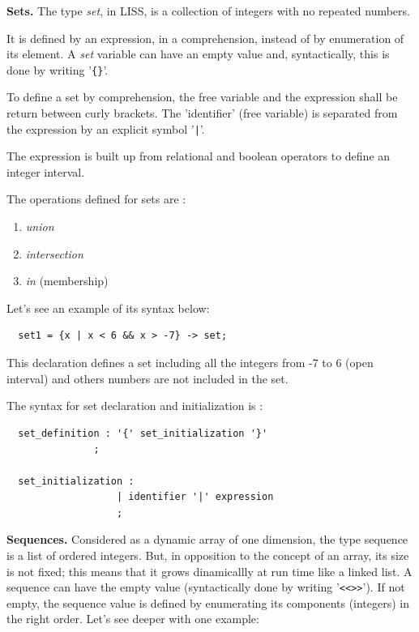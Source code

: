 \documentclass[
  oneside,
  11pt, a4paper,
  footinclude=true,
  headinclude=true,
  cleardoublepage=empty
]{scrbook}
\begin{document}
\textbf{Sets.}
The type \textit{set}, in LISS, is a collection of integers with no repeated numbers.

It is defined by an expression, in a comprehension, instead of by enumeration of its element.
A \textit{set} variable can have an empty value and, syntactically, this is done by writing '\verb+{}+'.

To define a set by comprehension, the free variable and the expression shall be return between curly brackets. The 'identifier' (free variable) is separated from the expression by an explicit symbol '\verb+|+'. 

The expression is built up from relational and boolean operators to define an integer interval.

The operations defined for sets are :
\begin{enumerate}
\item \textit{union}
\item \textit{intersection}
\item \textit{in} (membership)
\end{enumerate}


Let's see an example of its syntax below:

\begin{lstlisting}
  set1 = {x | x < 6 && x > -7} -> set;
\end{lstlisting}

This declaration defines a set including all the integers from -7 to 6 (open interval) and others numbers are not included in the set.

The syntax for set declaration and initialization is :

\begin{lstlisting}
  set_definition : '{' set_initialization '}'
               ;

  set_initialization :
                   | identifier '|' expression
                   ;
\end{lstlisting}

\bigbreak

\textbf{Sequences.}
Considered as a dynamic array of one dimension, the type sequence is a list of ordered integers. But, in opposition to the concept of an array, its size is not fixed; this means that it grows dinamicallly at run time like a linked list.
A sequence can have the empty value (syntactically done by writing '\verb+<<>>+').
If not empty, the sequence value is defined by enumerating its components (integers) in the right order.
Let's see deeper with one example:
\end{document}
